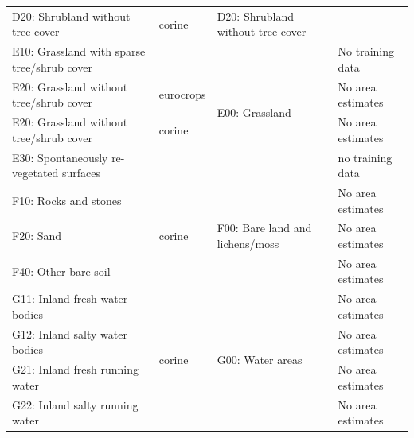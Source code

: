 \begin{table}[]
\begin{tabular}{l{2cm}lll}
D20: Shrubland without tree cover             & corine                  & D20: Shrubland without tree cover                     &                                                           \\
E10: Grassland with sparse tree/shrub cover   &                         & \multirow{4}{*}{E00: Grassland}                       & No training data                                          \\
E20: Grassland without tree/shrub cover       & eurocrops               &                                                       & No area estimates                                         \\
E20: Grassland without tree/shrub cover       & corine                  &                                                       & No area estimates                                         \\
E30: Spontaneously re-vegetated surfaces      &                         &                                                       & no training data                                          \\
F10: Rocks and stones                         & \multirow{3}{*}{corine} & \multirow{3}{*}{F00: Bare land and lichens/moss}      & No area estimates                                         \\
F20: Sand                                     &                         &                                                       & No area estimates                                         \\
F40: Other bare soil                          &                         &                                                       & No area estimates                                         \\
G11: Inland fresh water bodies                & \multirow{8}{*}{corine} & \multirow{8}{*}{G00: Water areas}                     & No area estimates                                         \\
G12: Inland salty water bodies                &                         &                                                       & No area estimates                                         \\
G21: Inland fresh running water               &                         &                                                       & No area estimates                                         \\
G22: Inland salty running water               &                         &                                                       & No area estimates                                         \\

\end{tabular}
\end{table}
